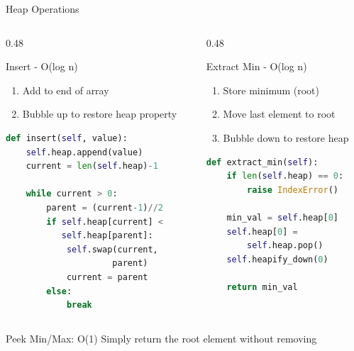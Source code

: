 \documentclass[aspectratio=169,xcolor=dvipsnames]{beamer}
\begin{document}
\begin{frame}[fragile]{Heap Operations}
  \begin{columns}
    \begin{column}{0.48\textwidth}
      \begin{block}{Insert - O(log n)}
        \begin{enumerate}
          \item Add to end of array
          \item Bubble up to restore heap property
        \end{enumerate}
        \begin{lstlisting}[language=Python,basicstyle=\tiny\ttfamily]
def insert(self, value):
    self.heap.append(value)
    current = len(self.heap)-1

    while current > 0:
        parent = (current-1)//2
        if self.heap[current] <
           self.heap[parent]:
            self.swap(current,
                     parent)
            current = parent
        else:
            break
        \end{lstlisting}
      \end{block}
    \end{column}
    \begin{column}{0.48\textwidth}
      \begin{block}{Extract Min - O(log n)}
        \begin{enumerate}
          \item Store minimum (root)
          \item Move last element to root
          \item Bubble down to restore heap
        \end{enumerate}
        \begin{lstlisting}[language=Python,basicstyle=\tiny\ttfamily]
def extract_min(self):
    if len(self.heap) == 0:
        raise IndexError()

    min_val = self.heap[0]
    self.heap[0] =
        self.heap.pop()
    self.heapify_down(0)

    return min_val
        \end{lstlisting}
      \end{block}
    \end{column}
  \end{columns}

  \begin{exampleblock}{Peek Min/Max: O(1)}
    Simply return the root element without removing
  \end{exampleblock}
\end{frame}
\end{document}
